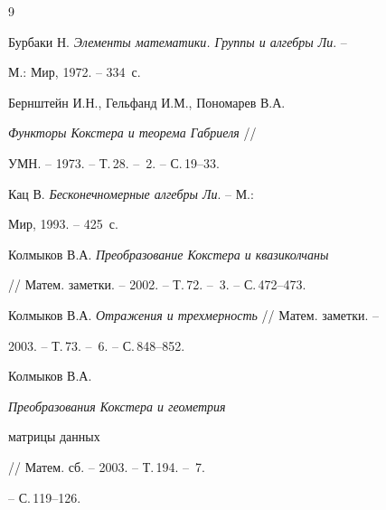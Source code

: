  


 


\begin{thebibliography}{9} 


 




Бурбаки Н. {\em Элементы математики. Группы и алгебры Ли}. -- 


М.: Мир, 1972. -- 334~с. 




Бернштейн И.Н., Гельфанд И.М., Пономарев В.А. 


{\em Функторы Кокстера и теорема Габриеля} // 


УМН. -- 1973. -- Т.\,28. -- \No\,2. -- С.\,19--33. 




Кац В. {\em Бесконечномерные алгебры Ли}. -- М.: 


Мир, 1993. -- 425~с. 




Колмыков В.А. {\em Преобразование Кокстера и квазиколчаны} 


// Матем. заметки. -- 2002. -- Т.\,72. -- \No\,3. -- С.\,472--473. 




Колмыков В.А. {\em Отражения и трехмерность} // Матем. заметки. --  


2003. -- Т.\,73. -- \No\,6. -- С.\,848--852. 




Колмыков В.А. {\em Преобразования Кокстера и геометрия


матрицы данных} // Матем. сб. -- 2003. -- Т.\,194. -- \No\,7. 


-- С.\,119--126. 


 


\end{thebibliography} 


 


\vskip 2cm 


 






 


\label{end} 


 


